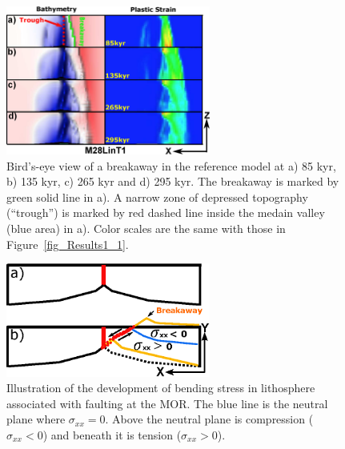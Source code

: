\documentclass[draft,gc]{agutex}
\begin{document}
\begin{figure}[h]
\noindent\includegraphics[width=0.6\textwidth]{./Figures/fig_Results1_4.eps}
   \caption[Bird's-eye view of a breakaway in the reference model.]{Bird's-eye view of a breakaway in the reference model at a) 85 kyr, b) 135 kyr, c) 265 kyr and d) 295 kyr. The breakaway is marked by green solid line in a). A narrow zone of depressed topography (``trough'') is marked by red dashed line inside the medain valley (blue area) in a). Color scales are the same with those in Figure~\ref{fig_Results1_1}.}
  \label{fig_Results1_4}
\end{figure}

\begin{figure}[h]
\noindent\includegraphics[width=0.6\textwidth]{./Figures/fig_Results4_8_sqrt_cut_back_bending_cartoon.eps}
   \caption[Illustration of bending stresses in lithosphere associated with faulting at the MOR.]{Illustration of the development of bending stress in lithosphere associated with faulting at the MOR. The blue line is the neutral plane where $\sigma_{xx}=0$. Above the neutral plane is compression ($\sigma_{xx}<0$) and beneath it is tension ($\sigma_{xx}>0$).}
  \label{fig_Results4_8}
\end{figure}
\end{document}
